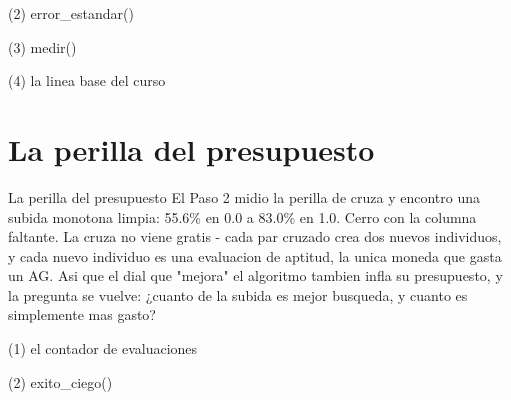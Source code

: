 \begin{frame}[fragile]{(2) error\_estandar()}

\end{frame}

\begin{frame}[fragile]{(3) medir()}

\end{frame}

\begin{frame}[fragile]{(4) la linea base del curso}

\end{frame}


\section{La perilla del presupuesto}

\begin{frame}{La perilla del presupuesto}
El Paso 2 midio la perilla de cruza y encontro una subida monotona limpia: 55.6\%
en 0.0 a 83.0\% en 1.0. Cerro con la columna faltante. La cruza no
viene gratis - cada par cruzado crea dos nuevos individuos, y cada
nuevo individuo es una evaluacion de aptitud, la unica moneda que gasta un AG. Asi
que el dial que "mejora" el algoritmo tambien infla su presupuesto, y la
pregunta se vuelve: ¿cuanto de la subida es mejor busqueda, y cuanto es
simplemente mas gasto?
\end{frame}

\begin{frame}[fragile]{(1) el contador de evaluaciones}

\end{frame}

\begin{frame}[fragile]{(2) exito\_ciego()}

\end{frame}

